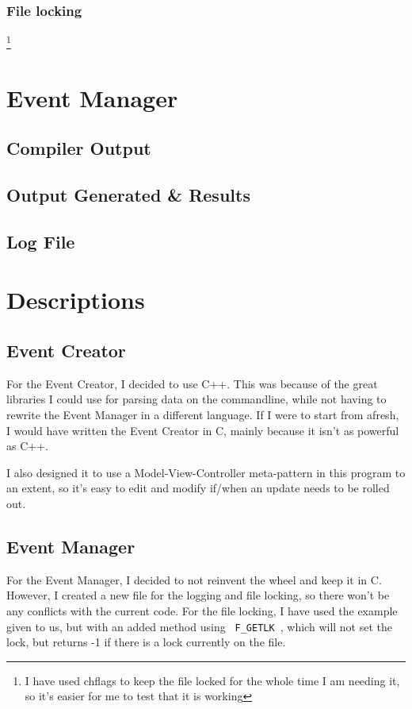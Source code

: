 \documentclass[10pt, a4paper]{article}
\begin{document}
\subsubsection{File locking}
 \footnote{I have used chflags to keep the file locked for the whole time I am needing it, so it's easier for me to test that it is working}

\newpage

\section{Event Manager}

\subsection{Compiler Output}


\subsection{Output Generated \& Results}


\subsection{Log File}


\section{Descriptions}

\subsection{Event Creator}
For the Event Creator, I decided to use C++. This was because of the great libraries I could use for parsing data on the commandline, while not having to rewrite the Event Manager in a different language. If I were to start from afresh, I would have written the Event Creator in C, mainly because it isn't as powerful as C++. 

I also designed it to use a Model-View-Controller meta-pattern in this program to an extent, so it's easy to edit and modify if/when an update needs to be rolled out. 

\subsection{Event Manager}
For the Event Manager, I decided to not reinvent the wheel and keep it in C. However, I created a new file for the logging and file locking, so there won't be any conflicts with the current code. For the file locking, I have used the example given to us, but with an added method using \verb+ F_GETLK +, which will not set the lock, but returns -1 if there is a lock currently on the file.
\end{document}
